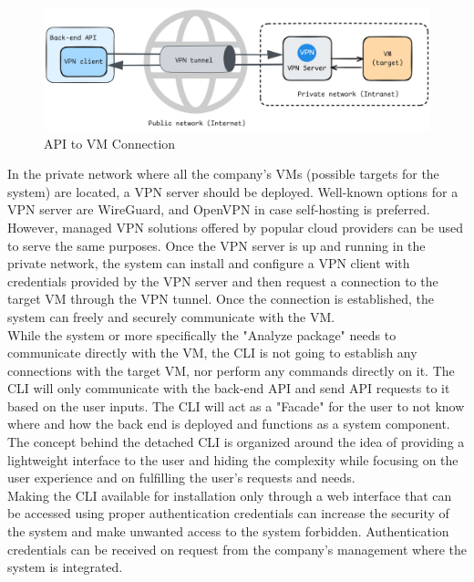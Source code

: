 \documentclass[twocolumn]{article}
\begin{document}
\begin{figure}[H]
    \centering
    \includegraphics[width=\linewidth]{images/api-vm-connection.png}
    \caption{API to VM Connection}
    \label{fig:api-vm-connection}
\end{figure}

In the private network where all the company's VMs (possible targets for the system) are located, a VPN server should be deployed. Well-known options for a VPN server are WireGuard, and OpenVPN in case self-hosting is preferred. However, managed VPN solutions offered by popular cloud providers can be used to serve the same purposes. Once the VPN server is up and running in the private network, the system can install and configure a VPN client with credentials provided by the VPN server and then request a connection to the target VM through the VPN tunnel. Once the connection is established, the system can freely and securely communicate with the VM.\\

While the system or more specifically the "Analyze package" needs to communicate directly with the VM, the CLI is not going to establish any connections with the target VM, nor perform any commands directly on it. The CLI will only communicate with the back-end API and send API requests to it based on the user inputs. The CLI will act as a "Facade" for the user to not know where and how the back end is deployed and functions as a system component. The concept behind the detached CLI is organized around the idea of providing a lightweight interface to the user and hiding the complexity while focusing on the user experience and on fulfilling the user's requests and needs. \\

Making the CLI available for installation only through a web interface that can be accessed using proper authentication credentials can increase the security of the system and make unwanted access to the system forbidden. Authentication credentials can be received on request from the company's management where the system is integrated.
\end{document}
